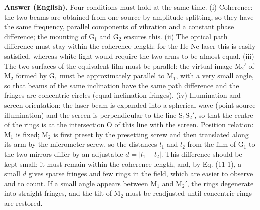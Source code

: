 \documentclass[11pt]{ctexart}
\newcommand{\Dl}{d}
\newcommand{\qaneed}[1]{\needspace{#1\textheight}}
\begin{document}
\textbf{Answer (English).} Four conditions must hold at the same time.
(i) Coherence: the two beams are obtained from one source by amplitude splitting, so they have the same frequency, parallel components of vibration and a constant phase difference; the mounting of G$_1$ and G$_2$ ensures this.
(ii) The optical path difference must stay within the coherence length: for the He-Ne laser this is easily satisfied, whereas white light would require the two arms to be almost equal.
(iii) The two surfaces of the equivalent film must be parallel: the virtual image M$_2'$ of M$_2$ formed by G$_1$ must be approximately parallel to M$_1$, with a very small angle, so that beams of the same inclination have the same path difference and the fringes are concentric circles (equal-inclination fringes).
(iv) Illumination and screen orientation: the laser beam is expanded into a spherical wave (point-source illumination) and the screen is perpendicular to the line S$_1$S$_2'$, so that the centre of the rings is at the intersection O of this line with the screen.
Position relation: M$_1$ is fixed; M$_2$ is first preset by the presetting screw and then translated along its arm by the micrometer screw, so the distances $l_1$ and $l_2$ from the film of G$_1$ to the two mirrors differ by an adjustable $\Dl=|l_1-l_2|$. This difference should be kept small: it must remain within the coherence length, and, by Eq. (11-1), a small $\Dl$ gives sparse fringes and few rings in the field, which are easier to observe and to count. If a small angle appears between M$_1$ and M$_2'$, the rings degenerate into straight fringes, and the tilt of M$_2$ must be readjusted until concentric rings are restored.

\qaneed{0.86}

\end{document}
